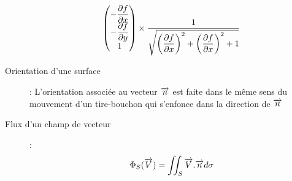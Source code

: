 \begin{description}
\[\begin{pmatrix}
            -\dfrac{\partial f}{\partial x}\\
            -\dfrac{\partial f}{\partial y}\\
            1
        \end{pmatrix}
        \times
        \frac{1}{
            \sqrt{
                \left(\dfrac{\partial f}{\partial x}\right)^2
                +\left(\dfrac{\partial f}{\partial x}\right)^2
                +1
            }   
        }
    \]
\item[Orientation d’une surface] : L'orientation associée au vecteur $\overrightarrow{n}$ est faite dans le même sens du mouvement
    d’un tire-bouchon qui s’enfonce dans la direction de $\overrightarrow{n}$
\item[Flux d'un champ de vecteur] :
    \[
        \Phi_S(\overrightarrow{V})=\iint_S\overrightarrow{V}.\overrightarrow{n}d\sigma
    \]
\end{description}